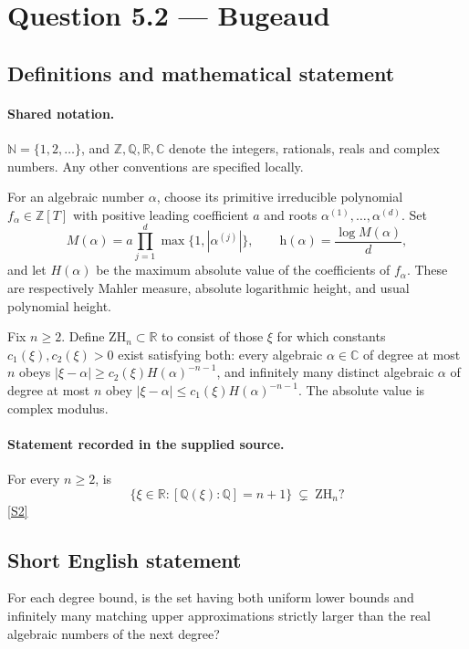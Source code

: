 \documentclass[11pt]{article}
\newcommand{\sref}[2]{\hyperlink{source:#1:#2}{[S#2]}}
\begin{document}
\section{Question 5.2 — Bugeaud}\label{statement}

\subsection{Definitions and mathematical statement}

\paragraph{Shared notation.}$\mathbb N=\{1,2,\ldots\}$, and $\mathbb Z,\mathbb Q,\mathbb R,\mathbb C$ denote the integers, rationals, reals and complex numbers. Any other conventions are specified locally.


For an algebraic number $\alpha$, choose its primitive irreducible polynomial $f_\alpha\in\mathbb Z[T]$ with positive leading coefficient $a$ and roots $\alpha^{(1)},\ldots,\alpha^{(d)}$. Set
\[
 M(\alpha)=a\prod_{j=1}^d\max\{1,|\alpha^{(j)}|\},\qquad
 \mathrm h(\alpha)=\frac{\log M(\alpha)}d,
\]
and let $H(\alpha)$ be the maximum absolute value of the coefficients of $f_\alpha$. These are respectively Mahler measure, absolute logarithmic height, and usual polynomial height.

Fix $n\ge2$. Define $\mathrm{ZH}_n\subset\mathbb R$ to consist of those $\xi$ for which constants $c_1(\xi),c_2(\xi)>0$ exist satisfying both: every algebraic $\alpha\in\mathbb C$ of degree at most $n$ obeys $|\xi-\alpha|\ge c_2(\xi)H(\alpha)^{-n-1}$, and infinitely many distinct algebraic $\alpha$ of degree at most $n$ obey $|\xi-\alpha|\le c_1(\xi)H(\alpha)^{-n-1}$. The absolute value is complex modulus.
\paragraph{Statement recorded in the supplied source.}
For every $n\ge2$, is
\[
\{\xi\in\mathbb R:[\mathbb Q(\xi):\mathbb Q]=n+1\}\ \subsetneq\ \mathrm{ZH}_n?
\] \sref{statement}{2}

\subsection{Short English statement}
For each degree bound, is the set having both uniform lower bounds and infinitely many matching upper approximations strictly larger than the real algebraic numbers of the next degree?
\end{document}
